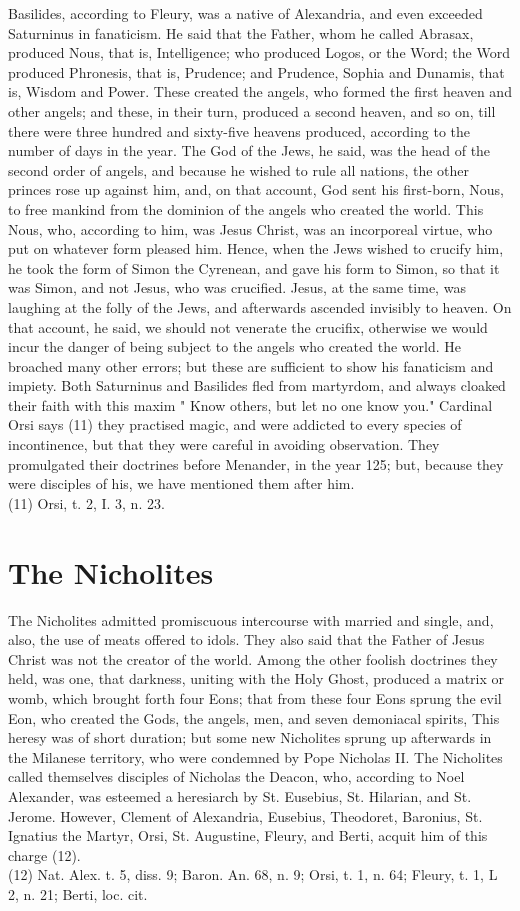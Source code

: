 \documentclass[12pt]{book}
\begin{document}
Basilides, according to Fleury, was a native of Alexandria, and even exceeded Saturninus in fanaticism.
He said that the Father, whom he called Abrasax, produced Nous, that is, Intelligence; who produced
Logos, or the Word; the Word produced Phronesis, that is, Prudence; and Prudence, Sophia and
Dunamis, that is, Wisdom and Power. These created the angels, who formed the first heaven and other
angels; and these, in their turn, produced a second heaven, and so on, till there were three hundred and
sixty-five heavens produced, according to the number of days in the year. The God of the Jews, he said,
was the head of the second order of angels, and because he wished to rule all nations, the other princes
rose up against him, and, on that account, God sent his first-born, Nous, to free mankind from the
dominion of the angels who created the world. This Nous, who, according to him, was Jesus Christ, was
an incorporeal virtue, who put on whatever form pleased him. Hence, when the Jews wished to crucify
him, he took the form of Simon the Cyrenean, and gave his form to Simon, so that it was Simon, and not
Jesus, who was crucified. Jesus, at the same time, was laughing at the folly of the Jews, and afterwards
ascended invisibly to heaven. On that account, he said, we should not venerate the crucifix, otherwise we
would incur the danger of being subject to the angels who created the world. He broached many other
errors; but these are sufficient to show his fanaticism and impiety. Both Saturninus and Basilides fled
from martyrdom, and always cloaked their faith with this maxim " Know others, but let no one know
you." Cardinal Orsi says (11) they practised magic, and were addicted to every species of incontinence,
but that they were careful in avoiding observation. They promulgated their doctrines before Menander,
in the year 125; but, because they were disciples of his, we have mentioned them after him.\\
(11) Orsi, t. 2, I. 3, n. 23.
\section{The Nicholites}
The Nicholites admitted promiscuous intercourse with married and single, and, also, the use of meats
offered to idols. They also said that the Father of Jesus Christ was not the creator of the world. Among the
other foolish doctrines they held, was one, that darkness, uniting with the Holy Ghost, produced a matrix
or womb, which brought forth four Eons; that from these four Eons sprung the evil Eon, who created the
Gods, the angels, men, and seven demoniacal spirits, This heresy was of short duration; but some new
Nicholites sprung up afterwards in the Milanese territory, who were condemned by Pope Nicholas II.
The Nicholites called themselves disciples of Nicholas the Deacon, who, according to Noel Alexander,
was esteemed a heresiarch by St. Eusebius, St. Hilarian, and St. Jerome. However, Clement of Alexandria,
Eusebius, Theodoret, Baronius, St. Ignatius the Martyr, Orsi, St. Augustine, Fleury, and Berti, acquit him
of this charge (12).\\
(12) Nat. Alex. t. 5, diss. 9; Baron. An. 68, n. 9; Orsi, t. 1, n. 64; Fleury, t. 1, L 2, n. 21; Berti, loc. cit.
\end{document}
